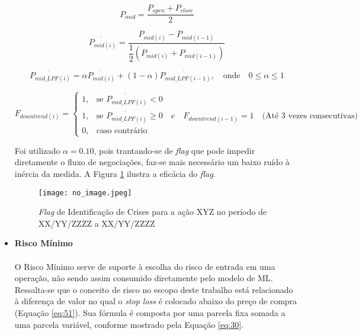 \begin{itemize}
    \begin{equation} \label{eq:22}
        P_{mid} = \dfrac{P_{open} + P_{close}}{2}
    \end{equation}

    \begin{equation} \label{eq:23}
        \dot{P_{mid(i)}} = \dfrac{ P_{mid(i)} - P_{mid(i-1)} }{ \dfrac{1}{2}(P_{mid(i)} + P_{mid(i-1)}) }
    \end{equation}

    \begin{equation} \label{eq:24}
        \dot{P_{mid\_LPF(i)}} = \alpha \dot{P_{mid(i)}} + (1 - \alpha) \dot{P_{mid\_LPF(i-1)}},  \quad \textrm{onde} \quad 0 \le \alpha \le 1
    \end{equation}

    \begin{equation} \label{eq:25}
        F_{downtrend(i)} = \begin{cases} 1, & \mbox{se } \dot{P_{mid\_LPF(i)}} < 0 \\ 1, & \mbox{se } \dot{P_{mid\_LPF(i)}} \ge 0 \quad e \quad F_{downtrend(i-1)} = 1 \quad \textrm{(At\'e 3 vezes consecutivas)} \\ 0, & \mbox{caso contr\'ario} \end{cases}
    \end{equation}

    Foi utilizado \begin{math} \alpha = 0.10 \end{math}, pois trantando-se de \textit{flag} que pode impedir diretamente o fluxo de negociações, faz-se mais necessário um baixo ruído à inércia da medida. A Figura \ref{fig:109} ilustra a eficácia do \textit{flag}. \\

    \begin{figure}[h]
        \texttt{[image: no\_image.jpeg]}
        \centering
        \caption{\textit{Flag} de Identificação de Crises para a ação XYZ no período de XX/YY/ZZZZ a XX/YY/ZZZZ}
        \label{fig:109}
    \end{figure}

    \item \textbf{Risco Mínimo} \\ \\
    O Risco Mínimo serve de suporte à escolha do risco de entrada em uma operação, não sendo assim consumido diretamente pelo modelo de ML. Ressalta-se que o conceito de risco no escopo deste trabalho está relacionado à diferença de valor no qual o \textit{stop loss} é colocado abaixo do preço de compra (Equação \ref{eq:51}). Sua fórmula é composta por uma parcela fixa somada a uma parcela variável, conforme mostrado pela Equação \ref{eq:30}.


\end{itemize}
